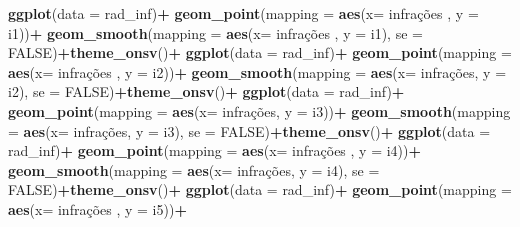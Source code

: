 \documentclass[
]{book}
\newenvironment{Shaded}{\begin{snugshade}}{\end{snugshade}}
\newcommand{\AttributeTok}[1]{\textcolor[rgb]{0.13,0.29,0.53}{#1}}
\newcommand{\ConstantTok}[1]{\textcolor[rgb]{0.56,0.35,0.01}{#1}}
\newcommand{\FunctionTok}[1]{\textcolor[rgb]{0.13,0.29,0.53}{\textbf{#1}}}
\newcommand{\NormalTok}[1]{#1}
\newcommand{\SpecialCharTok}[1]{\textcolor[rgb]{0.81,0.36,0.00}{\textbf{#1}}}
\begin{document}
\begin{Shaded}
\begin{Highlighting}[]
\FunctionTok{ggplot}\NormalTok{(}\AttributeTok{data =}\NormalTok{ rad\_inf)}\SpecialCharTok{+}
  \FunctionTok{geom\_point}\NormalTok{(}\AttributeTok{mapping =} \FunctionTok{aes}\NormalTok{(}\AttributeTok{x=}\NormalTok{ infrações , }\AttributeTok{y =}\NormalTok{ i1))}\SpecialCharTok{+}
  \FunctionTok{geom\_smooth}\NormalTok{(}\AttributeTok{mapping =} \FunctionTok{aes}\NormalTok{(}\AttributeTok{x=}\NormalTok{ infrações , }\AttributeTok{y =}\NormalTok{ i1), }\AttributeTok{se =} \ConstantTok{FALSE}\NormalTok{)}\SpecialCharTok{+}\FunctionTok{theme\_onsv}\NormalTok{()}\SpecialCharTok{+}
  \FunctionTok{ggplot}\NormalTok{(}\AttributeTok{data =}\NormalTok{ rad\_inf)}\SpecialCharTok{+}
  \FunctionTok{geom\_point}\NormalTok{(}\AttributeTok{mapping =} \FunctionTok{aes}\NormalTok{(}\AttributeTok{x=}\NormalTok{ infrações , }\AttributeTok{y =}\NormalTok{ i2))}\SpecialCharTok{+}
  \FunctionTok{geom\_smooth}\NormalTok{(}\AttributeTok{mapping =} \FunctionTok{aes}\NormalTok{(}\AttributeTok{x=}\NormalTok{ infrações, }\AttributeTok{y =}\NormalTok{ i2), }\AttributeTok{se =} \ConstantTok{FALSE}\NormalTok{)}\SpecialCharTok{+}\FunctionTok{theme\_onsv}\NormalTok{()}\SpecialCharTok{+}
  \FunctionTok{ggplot}\NormalTok{(}\AttributeTok{data =}\NormalTok{ rad\_inf)}\SpecialCharTok{+}
  \FunctionTok{geom\_point}\NormalTok{(}\AttributeTok{mapping =} \FunctionTok{aes}\NormalTok{(}\AttributeTok{x=}\NormalTok{ infrações, }\AttributeTok{y =}\NormalTok{ i3))}\SpecialCharTok{+}
  \FunctionTok{geom\_smooth}\NormalTok{(}\AttributeTok{mapping =} \FunctionTok{aes}\NormalTok{(}\AttributeTok{x=}\NormalTok{ infrações, }\AttributeTok{y =}\NormalTok{ i3), }\AttributeTok{se =} \ConstantTok{FALSE}\NormalTok{)}\SpecialCharTok{+}\FunctionTok{theme\_onsv}\NormalTok{()}\SpecialCharTok{+}
  \FunctionTok{ggplot}\NormalTok{(}\AttributeTok{data =}\NormalTok{ rad\_inf)}\SpecialCharTok{+}
  \FunctionTok{geom\_point}\NormalTok{(}\AttributeTok{mapping =} \FunctionTok{aes}\NormalTok{(}\AttributeTok{x=}\NormalTok{ infrações , }\AttributeTok{y =}\NormalTok{ i4))}\SpecialCharTok{+}
  \FunctionTok{geom\_smooth}\NormalTok{(}\AttributeTok{mapping =} \FunctionTok{aes}\NormalTok{(}\AttributeTok{x=}\NormalTok{ infrações, }\AttributeTok{y =}\NormalTok{ i4), }\AttributeTok{se =} \ConstantTok{FALSE}\NormalTok{)}\SpecialCharTok{+}\FunctionTok{theme\_onsv}\NormalTok{()}\SpecialCharTok{+}
  \FunctionTok{ggplot}\NormalTok{(}\AttributeTok{data =}\NormalTok{ rad\_inf)}\SpecialCharTok{+}
  \FunctionTok{geom\_point}\NormalTok{(}\AttributeTok{mapping =} \FunctionTok{aes}\NormalTok{(}\AttributeTok{x=}\NormalTok{ infrações , }\AttributeTok{y =}\NormalTok{ i5))}\SpecialCharTok{+}

\end{Highlighting}
\end{Shaded}
\end{document}
